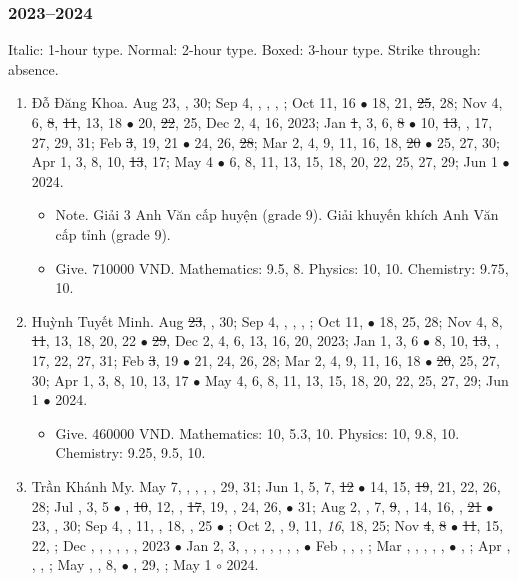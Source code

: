 \documentclass{article}
\begin{document}
\subsubsection{2023--2024}
Italic: 1-hour type. Normal: 2-hour type. Boxed: 3-hour type. Strike through: absence.
\begin{enumerate}
	\item {\sc Đỗ Đăng Khoa.} {\sf[In]} Aug 23, , 30; Sep 4, , , , ; Oct 11, 16 $\bullet$ 18, 21, \st{25}, 28; Nov 4, 6, \st{8}, \st{11}, 13, 18 $\bullet$ 20, \st{22}, 25, Dec 2, 4, 16, 2023; Jan \st{1}, 3, 6, \st{8} $\bullet$ 10, \st{13}, , 17, 27, 29, 31; Feb \st{3}, 19, 21 $\bullet$ 24, 26, \st{28}; Mar 2, 4, 9, 11, 16, 18, \st{20} $\bullet$ 25, 27, 30; Apr 1, 3, 8, 10, \st{13}, 17; May 4 $\bullet$ 6, 8, 11, 13, 15, 18, 20, 22, 25, 27, 29; Jun 1 $\bullet$ 2024.
	\begin{itemize}
		\item {\sf Note.} Giải 3 Anh Văn cấp huyện (grade 9). Giải khuyến khích Anh Văn cấp tỉnh (grade 9).
		\item {\sf Give.} 710000 VND. Mathematics: 9.5, 8. Physics: 10, 10. Chemistry: 9.75, 10.
	\end{itemize}
	\item {\sc Huỳnh Tuyết Minh.} {\sf[In]} Aug \st{23}, , 30; Sep 4, , , , ; Oct 11,  $\bullet$ 18, 25, 28; Nov 4, 8, \st{11}, 13, 18, 20, 22 $\bullet$ \st{29}, Dec 2, 4, 6, 13, 16, 20, 2023; Jan 1, 3, 6 $\bullet$ 8, 10, \st{13}, , 17, 22, 27, 31; Feb \st{3}, 19 $\bullet$ 21, 24, 26, 28; Mar 2, 4, 9, 11, 16, 18 $\bullet$ \st{20}, 25, 27, 30; Apr 1, 3, 8, 10, 13, 17 $\bullet$ May 4, 6, 8, 11, 13, 15, 18, 20, 22, 25, 27, 29; Jun 1 $\bullet$ 2024.
	\begin{itemize}
		\item {\sf Give.} 460000 VND. Mathematics: 10, 5.3, 10. Physics: 10, 9.8, 10. Chemistry: 9.25, 9.5, 10.
	\end{itemize}
	\item {\sc Trần Khánh My.} May 7, , , , , 29, 31; Jun 1, 5, 7, \st{12} $\bullet$ 14, 15, \st{19}, 21, 22, 26, 28; Jul , 3, 5 $\bullet$ , \st{10}, 12, , \st{17}, 19, , 24, 26,  $\bullet$ 31; Aug 2, , 7, \st{9}, , 14, 16, , \st{21} $\bullet$ 23, , 30; Sep 4, , 11, , 18, , 25 $\bullet$ ; Oct 2, , 9, 11, {\it16}, 18, 25; Nov \st{4}, \st{8} $\bullet$ \st{11}, 15, 22, ; Dec , , , , , , 2023 $\bullet$ Jan 2, 3, , , , , , , ,  $\bullet$ Feb , , , ; Mar , , , , ,  $\bullet$ , ; Apr , , , ; May , , 8,  $\bullet$ , 29, ; May 1 $\circ$ 2024.

\end{enumerate}
\end{document}
